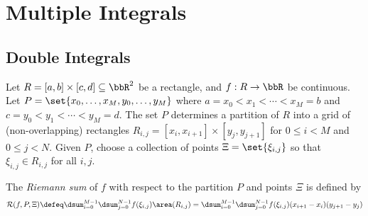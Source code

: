 
  \chapter{Multiple Integrals}%

  \section{Double Integrals}

  Let $R = [a, b] \times [c, d] \subseteq \bbR^2$ be a rectangle, and $f:R \to \bbR$ be continuous.
  Let $P = \set{ x_0, \dots, x_M, y_0, \dots, y_M}$ where $a = x_0 < x_1 < \cdots < x_M = b$ and $c = y_0 < y_1 < \cdots < y_M = d$.
  The set $P$ determines a partition of $R$ into a grid of (non-overlapping) rectangles $R_{i,j} = [x_i, x_{i+1}] \times [y_j, y_{j+1}]$ for $0 \leq i < M$ and $0 \leq j < N$.
  Given $P$, choose a collection of points $\Xi = \set{\xi_{i,j}}$ so that $\xi_{i,j} \in R_{i,j}$ for all $i, j$.
  \begin{definition}
    The \emph{Riemann sum} of $f$ with respect to the partition $P$ and points $\Xi$ is defined by
    \begin{equation*}
      \mathcal R(f, P, \Xi)
	\defeq \dsum_{i=0}^{M-1} \dsum_{j = 0}^{N-1}
	  f(\xi_{i, j}) \area(R_{i,j})
	= \dsum_{i=0}^{M-1} \dsum_{j = 0}^{N-1}
	  f(\xi_{i, j}) (x_{i+1} - x_i) (y_{j+1} - y_j)
    \end{equation*}
  \end{definition}
  

  \newcommand\DrawBlock[3]{
\ifx#1b\relax
  \path[draw]
    (lm\the\numexpr#2-1\relax) -- ++(0,0,#3) coordinate (blocklf)
    (bm\the\numexpr#2-1\relax) -- ++(0,0,#3) coordinate (blocklb)
    (lm#2) -- ++(0,0,#3) coordinate (blockrf)
    (bm#2) -- ++(0,0,#3) coordinate (blockrb);
  \filldraw[fill=white,draw=black]
    (lm\the\numexpr#2-1\relax) -- (blocklf) -- (blocklb) -- (blockrb) -- 
(blockrf) -- (lm#2);
\else  
  \ifx#1f\relax
    \path[draw]
      (fm\the\numexpr#2-1\relax) -- ++(0,0,#3) coordinate (blocklf)
      (lm\the\numexpr#2-1\relax) -- ++(0,0,#3) coordinate (blocklb)
      (fm#2) -- ++(0,0,#3) coordinate (blockrf)
      (lm#2) -- ++(0,0,#3) coordinate (blockrb);
    \filldraw[fill=white,draw=black]
      (fm\the\numexpr#2-1\relax) -- (blocklf) -- (blocklb) -- (blockrb) -- 
(blockrf) -- (fm#2);
  \fi
\fi
\draw (blocklf) -- (blockrf);
}

